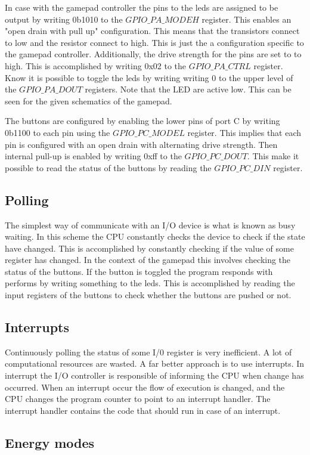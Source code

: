 In case with the gamepad controller the pins to the leds are assigned to be output by writing 0b1010 to the $GPIO\_PA\_MODEH$ register. This enables an "open drain with pull up" configuration. This means that the transistors connect to low and the resistor connect to high. This is just the a configuration specific to the gamepad controller. Additionally, the drive strength for the pins are set to to high. This is accomplished by writing 0x02 to the $GPIO\_PA\_CTRL$ register. Know it is possible to toggle the leds by writing writing 0 to the upper level of the $GPIO\_PA\_DOUT$ registers. Note that the LED are active low. This can be seen for the given schematics of the gamepad.   

The buttons are configured by enabling the lower pins of port C by writing 0b1100 to each pin using the $GPIO\_PC\_MODEL$ register. This implies that each pin is configured with an open drain with alternating drive strength. Then internal pull-up is enabled by writing 0xff to the $GPIO\_PC\_DOUT$. This make it possible to read the status of the buttons by reading the $GPIO\_PC\_DIN$ register. 



\subsection{Polling}\label{ch:polling}
The simplest way of communicate with an I/O device is what is known as busy waiting\cite{micro}. In this scheme the CPU constantly checks the device to check if the state have changed. This is accomplished by constantly checking if the value of some register has changed. In the context of the gamepad this involves checking the status of the buttons. If the button is toggled the program responds with performs by writing something to the leds. This is accomplished by reading the input registers of the buttons to check whether the buttons are pushed or not. 

\subsection{Interrupts}\label{ch:interrupts}
Continuously polling the status of some I/0 register is very inefficient. A lot of computational resources are wasted. A far better approach is to use interrupts. In interrupt the I/O controller is responsible of informing the CPU when change has occurred. When an interrupt occur the flow of execution is changed, and the CPU changes the program counter to point to an interrupt handler. The interrupt handler contains the code that should run in case of an interrupt.  


\subsection{Energy modes}\label{ch:energy_modes} 





